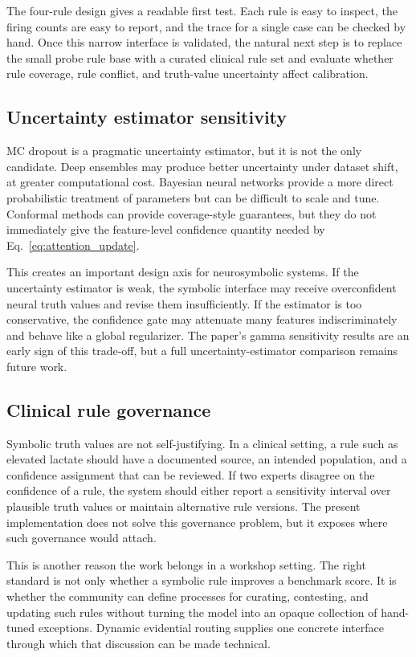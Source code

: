\documentclass{article}
\begin{document}
The four-rule design gives a readable first test. Each rule is easy to inspect, the firing counts are easy to report, and the trace for a single case can be checked by hand. Once this narrow interface is validated, the natural next step is to replace the small probe rule base with a curated clinical rule set and evaluate whether rule coverage, rule conflict, and truth-value uncertainty affect calibration.

\subsection{Uncertainty estimator sensitivity}

MC dropout is a pragmatic uncertainty estimator, but it is not the only candidate. Deep ensembles may produce better uncertainty under dataset shift, at greater computational cost. Bayesian neural networks provide a more direct probabilistic treatment of parameters but can be difficult to scale and tune. Conformal methods can provide coverage-style guarantees, but they do not immediately give the feature-level confidence quantity needed by Eq.~\ref{eq:attention_update}.

This creates an important design axis for neurosymbolic systems. If the uncertainty estimator is weak, the symbolic interface may receive overconfident neural truth values and revise them insufficiently. If the estimator is too conservative, the confidence gate may attenuate many features indiscriminately and behave like a global regularizer. The paper's gamma sensitivity results are an early sign of this trade-off, but a full uncertainty-estimator comparison remains future work.

\subsection{Clinical rule governance}

Symbolic truth values are not self-justifying. In a clinical setting, a rule such as elevated lactate should have a documented source, an intended population, and a confidence assignment that can be reviewed. If two experts disagree on the confidence of a rule, the system should either report a sensitivity interval over plausible truth values or maintain alternative rule versions. The present implementation does not solve this governance problem, but it exposes where such governance would attach.

This is another reason the work belongs in a workshop setting. The right standard is not only whether a symbolic rule improves a benchmark score. It is whether the community can define processes for curating, contesting, and updating such rules without turning the model into an opaque collection of hand-tuned exceptions. Dynamic evidential routing supplies one concrete interface through which that discussion can be made technical.
\end{document}
